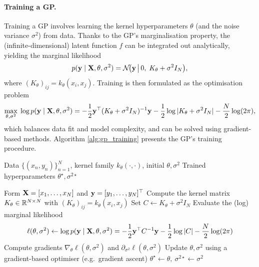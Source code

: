 \paragraph{Training a GP.}

Training a GP involves learning the kernel hyperparameters
\(\theta\) (and the noise variance \(\sigma^2\)) from data.
Thanks to the GP's marginalisation property, the (infinite-dimensional) latent function $f$ can be integrated out analytically, yielding the
marginal likelihood
\[
p({ \mathbf{y}} \mid { \mathbf{X}},\theta,\sigma^2)
=
\mathcal N\!\bigl({ \mathbf{y}} \,\big|\, 0,\; K_\theta+\sigma^2 I_N\bigr),
\]
where \((K_\theta)_{ij}=k_\theta(x_i,x_j)\).
Training is then formulated as the optimisation problem
\[
\max_{\theta,\sigma^2}\;
\log p({ \mathbf{y}} \mid { \mathbf{X}},\theta,\sigma^2)
=
-\frac{1}{2}{ \mathbf{y}}^\top (K_\theta+\sigma^2 I_N)^{-1}{ \mathbf{y}}
-\frac{1}{2}\log|K_\theta+\sigma^2 I_N|
-\frac{N}{2}\log(2\pi),
\]
which balances data fit and model complexity, and can be solved using
gradient-based methods. Algorithm \ref{alg:gp_training} presents the GP's training procedure. 


\begin{algorithm}[H]
\caption{Training a Gaussian Process via Marginal Likelihood}
\label{alg:gp_training}
\begin{algorithmic}[1]
\Require Data \(\{(x_n,y_n)\}_{n=1}^N\), kernel family \(k_\theta(\cdot,\cdot)\), initial \(\theta,\sigma^2\)
\Ensure Trained hyperparameters \(\theta^\star,\sigma^{2\star}\)

\State Form \({ \mathbf{X}}=[x_1,\ldots,x_N]\) and \({ \mathbf{y}}=[y_1,\ldots,y_N]^\top\)
\Repeat
    \State Compute the kernel matrix \(K_\theta \in {\mathbb R}^{N\times N}\) with \((K_\theta)_{ij}=k_\theta(x_i,x_j)\)
    \State Set \(C \gets K_\theta + \sigma^2 I_N\)
    \State Evaluate the (log) marginal likelihood
    \[
    \ell(\theta,\sigma^2) \gets \log p({ \mathbf{y}}\mid { \mathbf{X}},\theta,\sigma^2)
    = -\frac{1}{2}{ \mathbf{y}}^\top C^{-1}{ \mathbf{y}} - \frac{1}{2}\log|C| - \frac{N}{2}\log(2\pi)
    \]
    \State Compute gradients \(\nabla_\theta \ell(\theta,\sigma^2)\) and \(\partial_{\sigma^2}\ell(\theta,\sigma^2)\)
    \State Update \(\theta,\sigma^2\) using a gradient-based optimiser (e.g.\ gradient ascent)
\State \Return \(\theta^\star \gets \theta,\ \sigma^{2\star} \gets \sigma^2\)

\end{algorithmic}
\end{algorithm}


